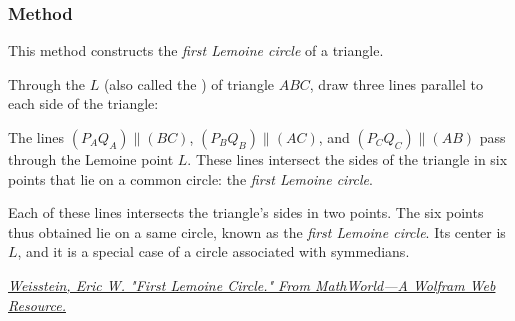 \subsubsection{Method }
\label{ssub:method_triangle_first_lemoine_circle}

This method constructs the \emph{first Lemoine circle} of a triangle.

Through the  $L$ (also called the ) of triangle $ABC$, draw three lines parallel to each side of the triangle:

The lines \( (P_AQ_A) \parallel (BC) \), \( (P_BQ_B) \parallel (AC) \), and \( (P_CQ_C) \parallel (AB) \) pass through the Lemoine point \( L \). These lines intersect the sides of the triangle in six points that lie on a common circle: the \emph{first Lemoine circle}.

Each of these lines intersects the triangle’s sides in two points. The six points thus obtained lie on a same circle, known as the \emph{first Lemoine circle}. Its center is $L$, and it is a special case of a circle associated with symmedians.
\begin{flushright}
\small
\href{https://mathworld.wolfram.com/FirstLemoineCircle.html}
{\textit{Weisstein, Eric W. "First Lemoine Circle." From MathWorld—A Wolfram Web Resource.}}
\end{flushright}

\vspace{1em}
\begin{minipage}{.5\textwidth}
\end{minipage}
\begin{minipage}{.5\textwidth}
\begin{tkzexample}
\end{tkzexample}
\end{minipage}

